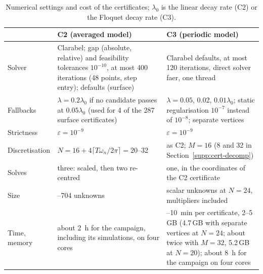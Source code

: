 \begin{table}[!tbp]
\centering
\caption{Numerical settings and cost of the certificates; $\lambda_0$ is the linear decay rate (C2) or the Floquet decay rate (C3).}
\label{tab:lmi-settings}
\small
\begin{tabular}{@{}>{\raggedright\arraybackslash}p{}>{\raggedright\arraybackslash}p{}>{\raggedright\arraybackslash}p{}@{}}
\toprule
 & C2 (averaged model) & C3 (periodic model)\\
\midrule
Solver & Clarabel; gap (absolute, relative) and feasibility tolerances $10^{-10}$, at most 400 iterations (48 points, step entry); defaults (surface) & Clarabel defaults, at most 120 iterations, direct solver faer, one thread\\
Fallbacks & $\lambda=0.2\lambda_0$ if no candidate passes at $0.05\lambda_0$ (used for 4 of the 287 surface certificates) & $\lambda=0.05$, 0.02, $0.01\lambda_0$; static regularisation $10^{-7}$ instead of $10^{-8}$; separate vertices\\
Strictness & $\varepsilon=10^{-9}$ & $\varepsilon=10^{-9}$\\
Discretisation & $N=16+4\lceil T\omega_n/2\pi\rceil=20$--32 & as C2; $M=16$ (8 and 32 in Section~\ref{supp:cert-decomp})\\
Solves & three: scaled, then two re-centred & one, in the coordinates of the C2 certificate\\
Size & 326--704 unknowns & 7009 scalar unknowns at $N=24$, multipliers included\\
Time, memory & about \SI{2}{\hour} for the campaign, including its simulations, on four cores & 4--\SI{10}{\minute} per certificate, 2--5\,GB (4.7\,GB with separate vertices at $N=24$; about twice with $M=32$, 5.2\,GB at $N=20$); about \SI{8}{\hour} for the campaign on four cores\\
\bottomrule
\end{tabular}
\end{table}


